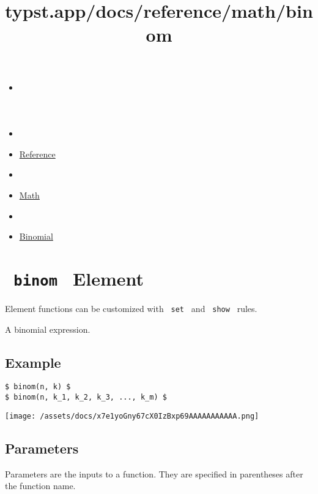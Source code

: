 \title{typst.app/docs/reference/math/binom}

\begin{itemize}
\tightlist
\item
  \href{/docs}{}
\item
  
\item
  \href{/docs/reference/}{Reference}
\item
  
\item
  \href{/docs/reference/math/}{Math}
\item
  
\item
  \href{/docs/reference/math/binom/}{Binomial}
\end{itemize}

\section{\texorpdfstring{\texttt{\ binom\ } {{ Element
}}}{ binom   Element }}\label{summary}

\label{element-tooltip}
Element functions can be customized with \texttt{\ set\ } and
\texttt{\ show\ } rules.

A binomial expression.

\subsection{Example}\label{example}

\begin{verbatim}
$ binom(n, k) $
$ binom(n, k_1, k_2, k_3, ..., k_m) $
\end{verbatim}

\texttt{[image: /assets/docs/x7e1yoGny67cX0IzBxp69AAAAAAAAAAA.png]}

\subsection{\texorpdfstring{{ Parameters
}}{ Parameters }}\label{parameters}

\label{parameters-tooltip}
Parameters are the inputs to a function. They are specified in
parentheses after the function name.

